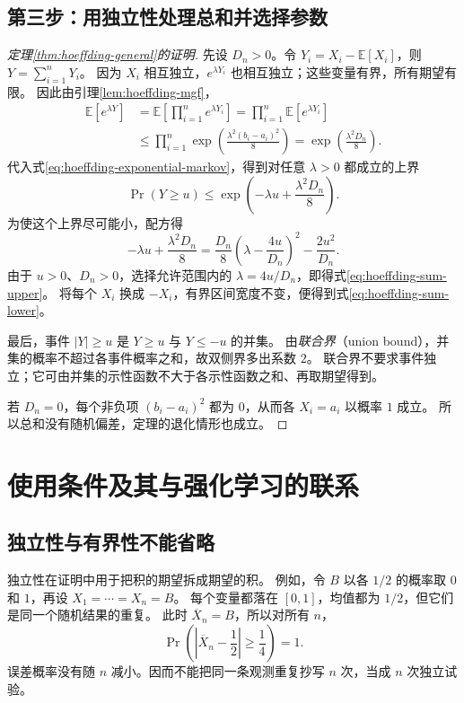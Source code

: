 \documentclass[UTF8,12pt,a4paper,fontset=fandol]{ctexart}
\begin{document}
\subsection{第三步：用独立性处理总和并选择参数}

\begin{proof}[定理\ref{thm:hoeffding-general}的证明]
先设 $D_n>0$。令 $Y_i=X_i-\mathbb E[X_i]$，则 $Y=\sum_{i=1}^{n}Y_i$。
因为 $X_i$ 相互独立，$e^{\lambda Y_i}$ 也相互独立；这些变量有界，所有期望有限。
因此由引理\ref{lem:hoeffding-mgf}，
\begin{align*}
  \mathbb E[e^{\lambda Y}]
  &=\mathbb E\!\left[\prod_{i=1}^{n}e^{\lambda Y_i}\right]
   =\prod_{i=1}^{n}\mathbb E[e^{\lambda Y_i}]\\
  &\leq\prod_{i=1}^{n}
    \exp\!\left(\frac{\lambda^2(b_i-a_i)^2}{8}\right)
   =\exp\!\left(\frac{\lambda^2D_n}{8}\right).
\end{align*}
代入式\eqref{eq:hoeffding-exponential-markov}，得到对任意 $\lambda>0$ 都成立的上界
\[
  \Pr(Y\geq u)\leq
  \exp\!\left(-\lambda u+\frac{\lambda^2D_n}{8}\right).
\]
为使这个上界尽可能小，配方得
\[
  -\lambda u+\frac{\lambda^2D_n}{8}
  =\frac{D_n}{8}\left(\lambda-\frac{4u}{D_n}\right)^2
   -\frac{2u^2}{D_n}.
\]
由于 $u>0$、$D_n>0$，选择允许范围内的 $\lambda=4u/D_n$，即得式\eqref{eq:hoeffding-sum-upper}。
将每个 $X_i$ 换成 $-X_i$，有界区间宽度不变，便得到式\eqref{eq:hoeffding-sum-lower}。

最后，事件 $|Y|\geq u$ 是 $Y\geq u$ 与 $Y\leq-u$ 的并集。
由\emph{联合界}（union bound），并集的概率不超过各事件概率之和，故双侧界多出系数 $2$。
联合界不要求事件独立；它可由并集的示性函数不大于各示性函数之和、再取期望得到。

若 $D_n=0$，每个非负项 $(b_i-a_i)^2$ 都为 $0$，从而各 $X_i=a_i$ 以概率 $1$ 成立。
所以总和没有随机偏差，定理的退化情形也成立。
\end{proof}

\section{使用条件及其与强化学习的联系}
\label{sec:hoeffding-scope}

\subsection{独立性与有界性不能省略}

独立性在证明中用于把积的期望拆成期望的积。
例如，令 $B$ 以各 $1/2$ 的概率取 $0$ 和 $1$，再设 $X_1=\cdots=X_n=B$。
每个变量都落在 $[0,1]$，均值都为 $1/2$，但它们是同一个随机结果的重复。
此时 $\overline X_n=B$，所以对所有 $n$，
\[
  \Pr\!\left(\left|\overline X_n-\frac12\right|\geq\frac14\right)=1.
\]
误差概率没有随 $n$ 减小。因而不能把同一条观测重复抄写 $n$ 次，当成 $n$ 次独立试验。
\end{document}
